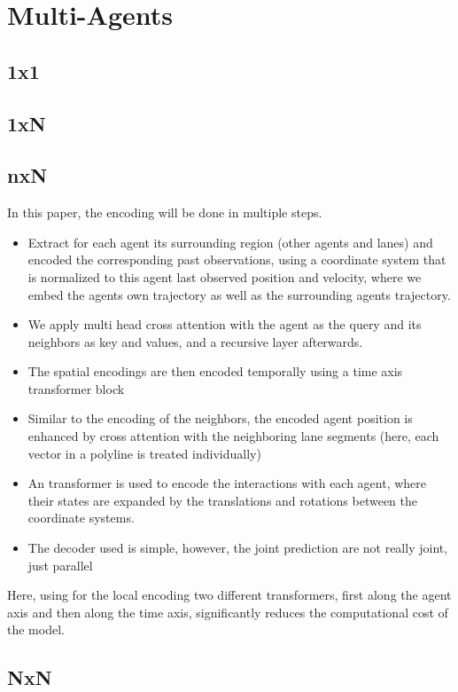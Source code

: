 \section{Multi-Agents}\label{sec: multi-agents}

\subsection{1x1}

\subsection{1xN}

\subsection{nxN}

 \cite{zhou2022hivt} In this paper, the encoding will be done in multiple steps. 
\begin{itemize}
	\item Extract for each agent its surrounding region (other agents and lanes) and encoded the corresponding past observations, using a coordinate system that is normalized to this agent last observed position and velocity, where we embed the agents own trajectory as well as the surrounding agents trajectory.
	\item We apply multi head cross attention with the agent as the query and its neighbors as key and values, and a recursive layer afterwards.
	\item The spatial encodings are then encoded temporally using a time axis transformer block
	\item Similar to the encoding of the neighbors, the encoded agent position is enhanced by cross attention with the neighboring lane segments (here, each vector in a polyline is treated individually)
	\item An transformer is used to encode the interactions with each agent, where their states are expanded by the translations and rotations between the coordinate systems.
	\item The decoder used is simple, however, the joint prediction are not really joint, just parallel
	
\end{itemize}
Here, using for the local encoding two different transformers, first along the agent axis and then along the time axis, significantly reduces the computational cost of the model.

\subsection{NxN}